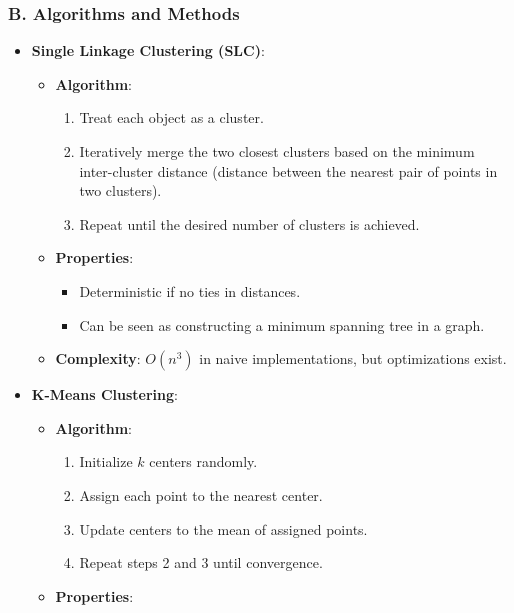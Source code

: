 \documentclass[
  12pt,
]{report}
\providecommand{\tightlist}{%
  \setlength{\itemsep}{0pt}\setlength{\parskip}{0pt}}
\begin{document}
\subsubsection{B. Algorithms and Methods}\label{b.-algorithms-and-methods-1}

\begin{itemize}
\tightlist
\item
  \textbf{Single Linkage Clustering (SLC)}:

  \begin{itemize}
  \tightlist
  \item
    \textbf{Algorithm}:

    \begin{enumerate}
    \def\labelenumi{\arabic{enumi}.}
    \tightlist
    \item
      Treat each object as a cluster.
    \item
      Iteratively merge the two closest clusters based on the minimum inter-cluster distance (distance between the nearest pair of points in two clusters).
    \item
      Repeat until the desired number of clusters is achieved.
    \end{enumerate}
  \item
    \textbf{Properties}:

    \begin{itemize}
    \tightlist
    \item
      Deterministic if no ties in distances.
    \item
      Can be seen as constructing a minimum spanning tree in a graph.
    \end{itemize}
  \item
    \textbf{Complexity}: \(O(n^3)\) in naive implementations, but optimizations exist.
  \end{itemize}
\item
  \textbf{K-Means Clustering}:

  \begin{itemize}
  \tightlist
  \item
    \textbf{Algorithm}:

    \begin{enumerate}
    \def\labelenumi{\arabic{enumi}.}
    \tightlist
    \item
      Initialize \(k\) centers randomly.
    \item
      Assign each point to the nearest center.
    \item
      Update centers to the mean of assigned points.
    \item
      Repeat steps 2 and 3 until convergence.
    \end{enumerate}
  \item
    \textbf{Properties}:


\end{itemize}
\end{itemize}
\end{document}
